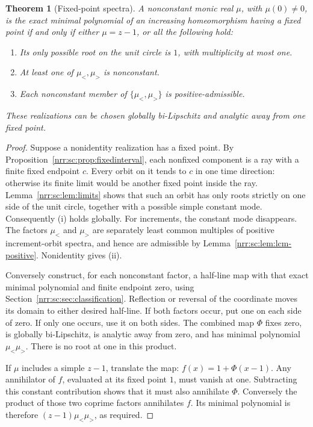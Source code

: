 \documentclass[11pt,letterpaper]{article}
\newtheorem{theorem}{Theorem}[section]
\theoremstyle{definition}
\theoremstyle{remark}
\begin{document}
\begin{theorem}[Fixed-point spectra]
\label{nrr:sc:thm:fixedpoint}
A nonconstant monic real $\mu$, with $\mu(0)\ne0$, is the exact minimal
polynomial of an increasing homeomorphism having a fixed point if and
only if either $\mu=z-1$, or all the following hold:
\begin{enumerate}[label=\textnormal{(\roman*)},leftmargin=2.4em]
\item Its only possible root on the unit circle is $1$, with multiplicity
at most one.
\item At least one of $\mu_{<},\mu_{>}$ is nonconstant.
\item Each nonconstant member of $\{\mu_{<},\mu_{>}\}$ is
positive-admissible.
\end{enumerate}
These realizations can be chosen globally bi-Lipschitz and analytic away
from one fixed point.
\end{theorem}
\begin{proof}
Suppose a nonidentity realization has a fixed point. By
Proposition~\ref{nrr:sc:prop:fixedinterval}, each nonfixed component is a ray
with a finite fixed endpoint $c$. Every orbit on it tends to $c$ in one
time direction: otherwise its finite limit would be another fixed point
inside the ray. Lemma~\ref{nrr:sc:lem:limits} shows that such an orbit has
only roots strictly on one side of the unit circle, together with a possible
simple constant mode. Consequently (i) holds globally.
For increments, the constant mode disappears. The factors $\mu_{<}$
and $\mu_{>}$ are separately least common multiples of positive
increment-orbit spectra, and hence are admissible by
Lemma~\ref{nrr:sc:lem:lcm-positive}. Nonidentity gives (ii).

Conversely construct, for each nonconstant factor, a half-line map
with that exact minimal polynomial and finite endpoint zero, using
Section~\ref{nrr:sc:sec:classification}. Reflection or reversal of the
coordinate moves its domain to either desired half-line. If both factors
occur, put one on each side of zero. If only one occurs, use it on both
sides. The combined map $\Phi$ fixes zero, is globally bi-Lipschitz, is
analytic away from zero, and has minimal polynomial $\mu_{<}\mu_{>}$.
There is no root at one in this product.

If $\mu$ includes a simple $z-1$, translate the map:
$f(x)=1+\Phi(x-1)$. Any annihilator of $f$, evaluated at its fixed point
$1$, must vanish at one. Subtracting this constant contribution shows
that it must also annihilate $\Phi$. Conversely the product of those two
coprime factors annihilates $f$. Its minimal polynomial is therefore
$(z-1)\mu_{<}\mu_{>}$, as required.
\end{proof}
\end{document}
